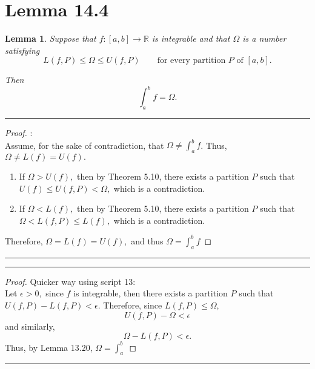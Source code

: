 \documentclass[openany, amssymb, psamsfonts]{amsart}
\newcommand{\bbR}{\mathbb{R}}
\newtheorem{lem}{Lemma}[section]
\theoremstyle{definition}
\numberwithin{equation}{section}
\begin{document}
\section*{Lemma 14.4}
\begin{lem} 
\label{14.4}
	Suppose that $f\colon [a, b] \to \bbR$ is integrable and that $\Omega$ is a number satisfying
	\[
		L(f, P) \leq \Omega \leq U(f, P) \qquad \text{for every partition $P$ of $[a, b]$.}
	\]

	Then 
	\[
		\int_{a}^{b} f = \Omega.
	\]
\end{lem}
\vspace{4pt}     \hrule   \vspace{4pt} \begin{proof}:\\
    Assume, for the sake of contradiction, that $\Omega \neq \int_a^b f$. Thus, $\Omega \neq L(f) = U(f).$ 
    \begin{enumerate}
        \item If $\Omega> U(f),$ then by Theorem 5.10, there exists a partition $P$ such that $U(f)\leq U(f,P)< \Omega,$ which is a contradiction.
        \item If $\Omega < L(f),$ then by Theorem 5.10, there exists a partition $P$ such that $\Omega < L(f,P)\leq L(f),$ which is a contradiction.
    \end{enumerate}
    Therefore, $\Omega = L(f) = U(f),$ and thus $\Omega = \int_a^bf$
\end{proof} \vspace{4pt}     \hrule   \vspace{4pt} 
\vspace{4pt}     \hrule   \vspace{4pt} \begin{proof} Quicker way using script 13:\\
    Let $\epsilon>0,$ since $f$ is integrable, then  there exists a partition $P$ such that $U(f,P) - L(f,P)< \epsilon.$ Therefore, since $L(f,P)\leq \Omega,$ \[U(f,P) - \Omega < \epsilon\] and similarly, \[\Omega - L(f,P)< \epsilon.\] Thus, by Lemma 13.20, $\Omega = \int_a^b$
\end{proof} \vspace{4pt}     \hrule   \vspace{4pt} 
\end{document}
